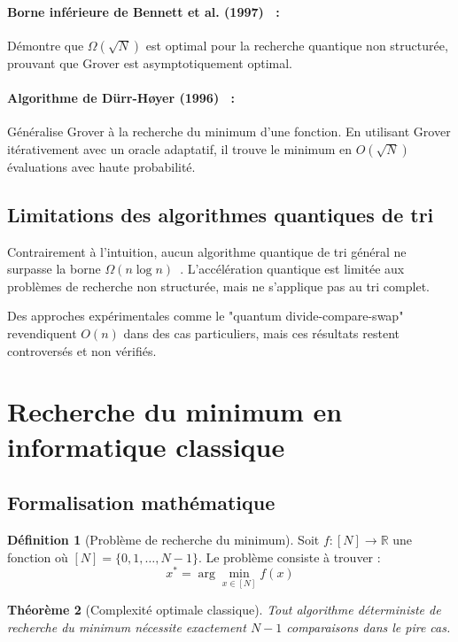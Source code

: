 \documentclass[12pt,a4paper]{article}
\newtheorem{theorem}{Théorème}[section]
\theoremstyle{definition}
\newtheorem{definition}[theorem]{Définition}
\theoremstyle{remark}
\begin{document}
\paragraph{Borne inférieure de Bennett et al. (1997)~\cite{bennett1997} :}
Démontre que $\Omega(\sqrt{N})$ est optimal pour la recherche quantique non structurée, prouvant que Grover est asymptotiquement optimal.

\paragraph{Algorithme de Dürr-Høyer (1996)~\cite{durr1996} :}
Généralise Grover à la recherche du minimum d'une fonction. En utilisant Grover itérativement avec un oracle adaptatif, il trouve le minimum en $O(\sqrt{N})$ évaluations avec haute probabilité.

\subsection{Limitations des algorithmes quantiques de tri}

Contrairement à l'intuition, aucun algorithme quantique de tri général ne surpasse la borne $\Omega(n \log n)$~\cite{hoyer2000quantum}. L'accélération quantique est limitée aux problèmes de recherche non structurée, mais ne s'applique pas au tri complet.

Des approches expérimentales comme le "quantum divide-compare-swap" revendiquent $O(n)$ dans des cas particuliers, mais ces résultats restent controversés et non vérifiés.

\newpage

\section{Recherche du minimum en informatique classique}

\subsection{Formalisation mathématique}

\begin{definition}[Problème de recherche du minimum]
Soit $f : [N] \to \mathbb{R}$ une fonction où $[N] = \{0, 1, \ldots, N-1\}$. Le problème consiste à trouver :
\[
x^* = \arg\min_{x \in [N]} f(x)
\]
\end{definition}

\begin{theorem}[Complexité optimale classique]
Tout algorithme déterministe de recherche du minimum nécessite exactement $N-1$ comparaisons dans le pire cas.
\end{theorem}
\end{document}
